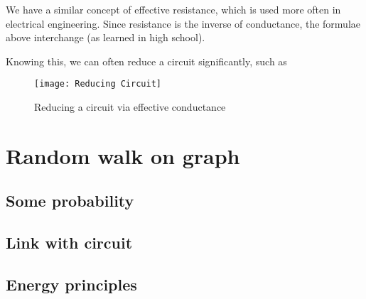 \documentclass[11pt]{article}
\begin{document}
We have a similar concept of effective resistance, which is used more often in electrical engineering. Since resistance is the inverse of conductance, the formulae above interchange (as learned in high school).

Knowing this, we can often reduce a circuit significantly, such as
\begin{figure}[ht]
  \centering
  \texttt{[image: Reducing Circuit]}
  \caption{Reducing a circuit via effective conductance}
\end{figure}

\section{Random walk on graph}
\subsection{Some probability}
\subsection{Link with circuit}
\subsection{Energy principles}
\end{document}
